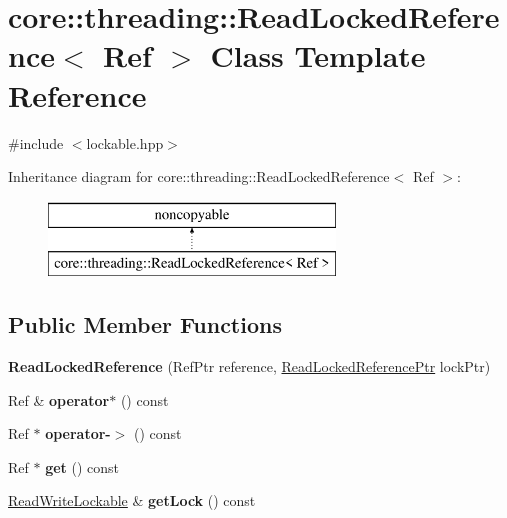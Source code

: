 \hypertarget{classcore_1_1threading_1_1_read_locked_reference}{\section{core\-:\-:threading\-:\-:Read\-Locked\-Reference$<$ Ref $>$ Class Template Reference}
\label{classcore_1_1threading_1_1_read_locked_reference}
}


{\ttfamily \#include $<$lockable.\-hpp$>$}

Inheritance diagram for core\-:\-:threading\-:\-:Read\-Locked\-Reference$<$ Ref $>$\-:\begin{figure}[H]
\begin{center}
\leavevmode
\includegraphics[height=2.000000cm]{classcore_1_1threading_1_1_read_locked_reference}
\end{center}
\end{figure}
\subsection*{Public Member Functions}
\begin{DoxyCompactItemize}
\item 
\hypertarget{classcore_1_1threading_1_1_read_locked_reference_adfc55e570e72f81348095557c3e6de24}{{\bfseries Read\-Locked\-Reference} (Ref\-Ptr reference, \hyperlink{class_read_locked_reference_ptr}{Read\-Locked\-Reference\-Ptr} lock\-Ptr)}\label{classcore_1_1threading_1_1_read_locked_reference_adfc55e570e72f81348095557c3e6de24}

\item 
\hypertarget{classcore_1_1threading_1_1_read_locked_reference_a3fd909511be622fe2e367913404b408a}{Ref \& {\bfseries operator$\ast$} () const }\label{classcore_1_1threading_1_1_read_locked_reference_a3fd909511be622fe2e367913404b408a}

\item 
\hypertarget{classcore_1_1threading_1_1_read_locked_reference_ad150f3f4681ddceb97cfdd646354c7d2}{Ref $\ast$ {\bfseries operator-\/$>$} () const }\label{classcore_1_1threading_1_1_read_locked_reference_ad150f3f4681ddceb97cfdd646354c7d2}

\item 
\hypertarget{classcore_1_1threading_1_1_read_locked_reference_a8933e529e870e5ec81b714ed6b12cbb5}{Ref $\ast$ {\bfseries get} () const }\label{classcore_1_1threading_1_1_read_locked_reference_a8933e529e870e5ec81b714ed6b12cbb5}

\item 
\hypertarget{classcore_1_1threading_1_1_read_locked_reference_a7f2ba2e42fb957f9f05c359391ced67c}{\hyperlink{classcore_1_1threading_1_1_read_write_lockable}{Read\-Write\-Lockable} \& {\bfseries get\-Lock} () const }\label{classcore_1_1threading_1_1_read_locked_reference_a7f2ba2e42fb957f9f05c359391ced67c}

\end{DoxyCompactItemize}
